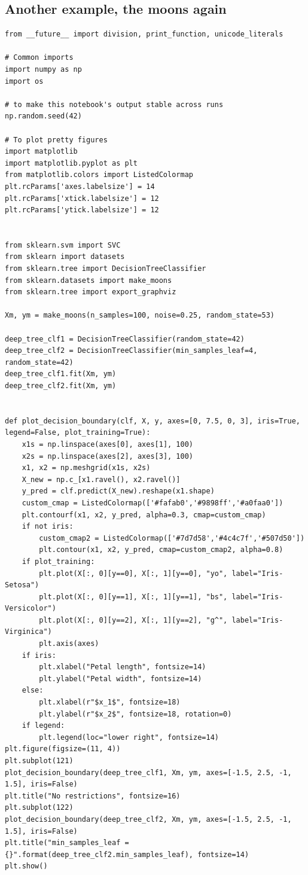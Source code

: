 \documentclass[%
oneside,                 %
final,                   %
10pt]{article}
\begin{document}
\subsection*{Another example, the moons again}
\begin{verbatim}
from __future__ import division, print_function, unicode_literals

# Common imports
import numpy as np
import os

# to make this notebook's output stable across runs
np.random.seed(42)

# To plot pretty figures
import matplotlib
import matplotlib.pyplot as plt
from matplotlib.colors import ListedColormap
plt.rcParams['axes.labelsize'] = 14
plt.rcParams['xtick.labelsize'] = 12
plt.rcParams['ytick.labelsize'] = 12


from sklearn.svm import SVC
from sklearn import datasets
from sklearn.tree import DecisionTreeClassifier
from sklearn.datasets import make_moons
from sklearn.tree import export_graphviz

Xm, ym = make_moons(n_samples=100, noise=0.25, random_state=53)

deep_tree_clf1 = DecisionTreeClassifier(random_state=42)
deep_tree_clf2 = DecisionTreeClassifier(min_samples_leaf=4, random_state=42)
deep_tree_clf1.fit(Xm, ym)
deep_tree_clf2.fit(Xm, ym)


def plot_decision_boundary(clf, X, y, axes=[0, 7.5, 0, 3], iris=True, legend=False, plot_training=True):
    x1s = np.linspace(axes[0], axes[1], 100)
    x2s = np.linspace(axes[2], axes[3], 100)
    x1, x2 = np.meshgrid(x1s, x2s)
    X_new = np.c_[x1.ravel(), x2.ravel()]
    y_pred = clf.predict(X_new).reshape(x1.shape)
    custom_cmap = ListedColormap(['#fafab0','#9898ff','#a0faa0'])
    plt.contourf(x1, x2, y_pred, alpha=0.3, cmap=custom_cmap)
    if not iris:
        custom_cmap2 = ListedColormap(['#7d7d58','#4c4c7f','#507d50'])
        plt.contour(x1, x2, y_pred, cmap=custom_cmap2, alpha=0.8)
    if plot_training:
        plt.plot(X[:, 0][y==0], X[:, 1][y==0], "yo", label="Iris-Setosa")
        plt.plot(X[:, 0][y==1], X[:, 1][y==1], "bs", label="Iris-Versicolor")
        plt.plot(X[:, 0][y==2], X[:, 1][y==2], "g^", label="Iris-Virginica")
        plt.axis(axes)
    if iris:
        plt.xlabel("Petal length", fontsize=14)
        plt.ylabel("Petal width", fontsize=14)
    else:
        plt.xlabel(r"$x_1$", fontsize=18)
        plt.ylabel(r"$x_2$", fontsize=18, rotation=0)
    if legend:
        plt.legend(loc="lower right", fontsize=14)
plt.figure(figsize=(11, 4))
plt.subplot(121)
plot_decision_boundary(deep_tree_clf1, Xm, ym, axes=[-1.5, 2.5, -1, 1.5], iris=False)
plt.title("No restrictions", fontsize=16)
plt.subplot(122)
plot_decision_boundary(deep_tree_clf2, Xm, ym, axes=[-1.5, 2.5, -1, 1.5], iris=False)
plt.title("min_samples_leaf = {}".format(deep_tree_clf2.min_samples_leaf), fontsize=14)
plt.show()

\end{verbatim}
\end{document}
